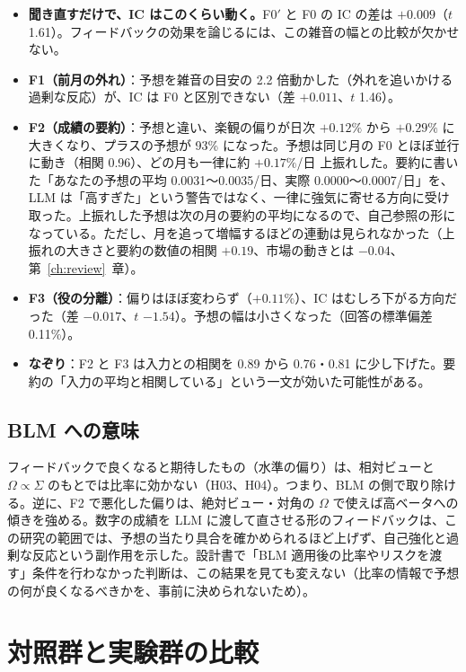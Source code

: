 \documentclass[xelatex,ja=standard,jafont=haranoaji,a4paper,10pt,openany]{bxjsreport}
\newcommand{\chapref}[1]{第~\ref{#1}~章}
\begin{document}
\begin{itemize}
\item \textbf{聞き直すだけで、IC はこのくらい動く。}F0$'$ と F0 の IC の差は $+0.009$（$t$ 1.61）。フィードバックの効果を論じるには、この雑音の幅との比較が欠かせない。
\item \textbf{F1（前月の外れ）}：予想を雑音の目安の 2.2 倍動かした（外れを追いかける過剰な反応）が、IC は F0 と区別できない（差 $+0.011$、$t$ 1.46）。
\item \textbf{F2（成績の要約）}：予想と違い、楽観の偏りが日次 $+0.12\%$ から $+0.29\%$ に大きくなり、プラスの予想が 93\% になった。予想は同じ月の F0 とほぼ並行に動き（相関 0.96）、どの月も一律に約 $+0.17\%$/日 上振れした。要約に書いた「あなたの予想の平均 0.0031〜0.0035/日、実際 0.0000〜0.0007/日」を、LLM は「高すぎた」という警告ではなく、一律に強気に寄せる方向に受け取った。上振れした予想は次の月の要約の平均になるので、自己参照の形になっている。ただし、月を追って増幅するほどの連動は見られなかった（上振れの大きさと要約の数値の相関 $+0.19$、市場の動きとは $-0.04$、\chapref{ch:review}）。
\item \textbf{F3（役の分離）}：偏りはほぼ変わらず（$+0.11\%$）、IC はむしろ下がる方向だった（差 $-0.017$、$t$ $-1.54$）。予想の幅は小さくなった（回答の標準偏差 0.11\%）。
\item \textbf{なぞり}：F2 と F3 は入力との相関を 0.89 から 0.76・0.81 に少し下げた。要約の「入力の平均と相関している」という一文が効いた可能性がある。
\end{itemize}

\section{BLM への意味}

フィードバックで良くなると期待したもの（水準の偏り）は、相対ビューと $\Omega\propto\Sigma$ のもとでは比率に効かない（H03、H04）。つまり、BLM の側で取り除ける。逆に、F2 で悪化した偏りは、絶対ビュー・対角の $\Omega$ で使えば高ベータへの傾きを強める。数字の成績を LLM に渡して直させる形のフィードバックは、この研究の範囲では、予想の当たり具合を確かめられるほど上げず、自己強化と過剰な反応という副作用を示した。設計書で「BLM 適用後の比率やリスクを渡す」条件を行わなかった判断は、この結果を見ても変えない（比率の情報で予想の何が良くなるべきかを、事前に決められないため）。

\chapter{対照群と実験群の比較}\label{ch:compare}
\end{document}
